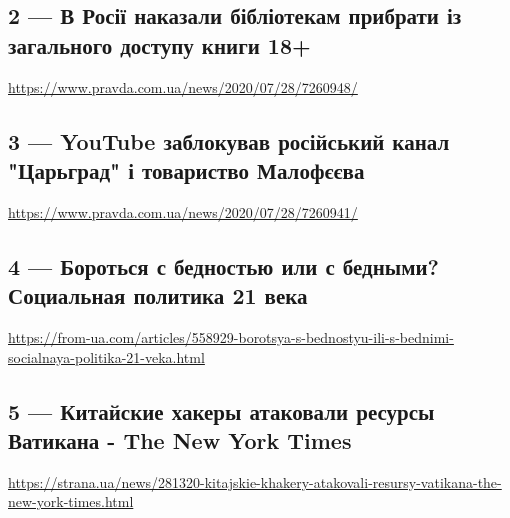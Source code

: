 \subsection{2 --- В Росії наказали бібліотекам прибрати із загального доступу книги 18+}
\url{https://www.pravda.com.ua/news/2020/07/28/7260948/}

\subsection{3 --- YouTube заблокував російський канал "Царьград" і товариство Малофєєва}
\url{https://www.pravda.com.ua/news/2020/07/28/7260941/}

\subsection{4 --- Бороться с бедностью или с бедными? Социальная политика 21 века}
\url{https://from-ua.com/articles/558929-borotsya-s-bednostyu-ili-s-bednimi-socialnaya-politika-21-veka.html}

\subsection{5 --- Китайские хакеры атаковали ресурсы Ватикана - The New York Times}
\url{https://strana.ua/news/281320-kitajskie-khakery-atakovali-resursy-vatikana-the-new-york-times.html}
 
